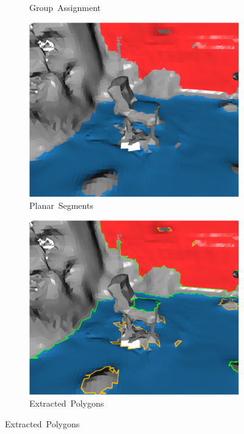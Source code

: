 \begin{figure}[H]
\begin{subfigure}[t]{.22\linewidth}
    \caption{Group~Assignment\label{fig:ch3_planar_seg_b}}\vspace{6pt}
  \end{subfigure}
  \hfill
  \begin{subfigure}[t]{.22\linewidth}
    \centering\includegraphics[clip,trim=0cm 0cm 0cm 0cm,width=.99\linewidth]{chapter_3_polylidar3d/imgs/meshes/planar_segment-region_c.pdf}
    \caption{Planar~Segments\label{fig:ch3_planar_seg_c}}\vspace{6pt}
  \end{subfigure}
  \hfill
  \begin{subfigure}[t]{.22\linewidth}
    \centering\includegraphics[clip,trim=0cm 0cm 0cm 0cm,width=.99\linewidth]{chapter_3_polylidar3d/imgs/meshes/planar_segment-region_d.pdf}
    \caption{Extracted~Polygons\label{fig:ch3_planar_seg_d}}\vspace{6pt}
  \end{subfigure}


\end{figure}
